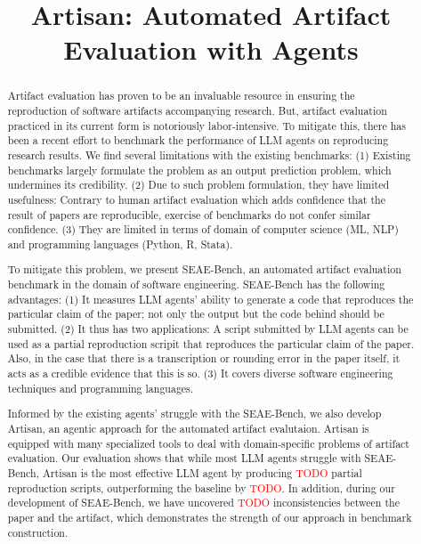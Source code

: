 \documentclass[acmsmall,screen,review,anonymous]{acmart}
\begin{document}
\newcommand\artisanpartial{\textcolor{red}{TODO}}
\newcommand\artisanpartialoutperform{\textcolor{red}{TODO}}
\newcommand\inconsistencies{\textcolor{red}{TODO}}

\title{Artisan: Automated Artifact Evaluation with Agents}
\begin{abstract}
    Artifact evaluation  has proven to be an invaluable resource in ensuring the reproduction of software artifacts accompanying research.
    But, artifact evaluation practiced in its current form is notoriously labor-intensive.
    To mitigate this, there has been a recent effort to benchmark the performance of LLM agents on reproducing research results.
    We find several limitations with the existing benchmarks:
    (1) Existing benchmarks largely formulate the problem as an output prediction problem, which undermines its credibility.
    (2) Due to such problem formulation, they have limited usefulness: Contrary to human artifact evaluation which adds confidence that the result of papers are reproducible, exercise of benchmarks do not confer similar confidence.
    (3) They are limited in terms of domain of computer science (ML, NLP) and programming languages (Python, R, Stata).
    
    To mitigate this problem, we present SEAE-Bench, an automated artifact evaluation benchmark in the domain of software engineering.
    SEAE-Bench has the following advantages:
    (1) It measures LLM agents' ability to generate a code that reproduces the particular claim of the paper; not only the output but the code behind should be submitted.
    (2) It thus has two applications: A script submitted by LLM agents can be used as a partial reproduction scripit that reproduces the particular claim of the paper. Also, in the case that there is a transcription or rounding error in the paper itself, it acts as a credible evidence that this is so.
    (3) It covers diverse software engineering techniques and programming languages.

    Informed by the existing agents' struggle with the SEAE-Bench, we also develop Artisan, an agentic approach for the automated artifact evalutaion.
    Artisan is equipped with many specialized tools to deal with domain-specific problems of artifact evaluation.
    Our evaluation shows that while most LLM agents struggle with SEAE-Bench, Artisan is the most effective LLM agent by producing \artisanpartial{} partial reproduction scripts, outperforming the baseline by \artisanpartialoutperform{}.
    In addition, during our development of SEAE-Bench, we have uncovered \inconsistencies{} inconsistencies between the paper and the artifact, which demonstrates the strength of our approach in benchmark construction.
\end{abstract}
\maketitle









\end{document}
